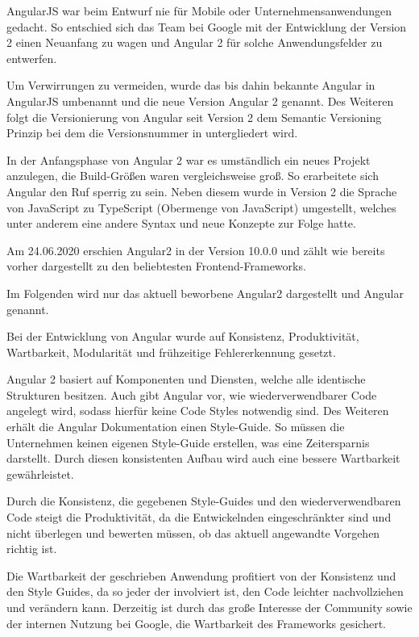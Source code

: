 AngularJS war beim Entwurf nie für Mobile oder Unternehmensanwendungen gedacht.
So entschied sich das Team bei Google mit der Entwicklung der Version 2 einen Neuanfang zu wagen und Angular 2 für solche Anwendungsfelder zu entwerfen. \cite{gaviganHistoryAngular2018}

Um Verwirrungen zu vermeiden, wurde das bis dahin bekannte Angular in AngularJS umbenannt und die neue Version Angular 2 genannt. Des Weiteren folgt die Versionierung von Angular seit Version 2 dem Semantic Versioning Prinzip bei dem die Versionsnummer in  untergliedert wird. \cite{gaviganHistoryAngular2018} 

In der Anfangsphase von Angular 2 war es umständlich ein neues Projekt anzulegen, die Build-Größen waren vergleichsweise groß. So erarbeitete sich Angular den Ruf sperrig zu sein.
Neben diesem wurde in Version 2 die Sprache von JavaScript zu TypeScript (Obermenge von JavaScript) umgestellt, welches unter anderem eine andere Syntax und neue Konzepte zur Folge hatte. \cite{gaviganHistoryAngular2018}

Am 24.06.2020 erschien Angular2 in der Version 10.0.0 \cite{googleAngularAngularVersioning2020} und zählt wie bereits vorher dargestellt zu den beliebtesten Frontend-Frameworks.

Im Folgenden wird nur das aktuell beworbene Angular2 dargestellt und Angular genannt.

Bei der Entwicklung von Angular wurde auf Konsistenz, Produktivität, Wartbarkeit, Modularität und frühzeitige Fehlererkennung gesetzt.

Angular 2 basiert auf Komponenten und Diensten, welche alle identische Strukturen besitzen. Auch gibt Angular vor, wie wiederverwendbarer Code angelegt wird, sodass hierfür keine Code Styles notwendig sind. Des Weiteren erhält die Angular Dokumentation einen Style-Guide. So müssen die Unternehmen keinen eigenen Style-Guide erstellen, was eine Zeitersparnis darstellt. Durch diesen konsistenten Aufbau wird auch eine bessere Wartbarkeit gewährleistet. \cite{wahlinWesentlichenVorteileAngular2017}

Durch die Konsistenz, die gegebenen Style-Guides und den wiederverwendbaren Code steigt die Produktivität, da die Entwickelnden eingeschränkter sind und nicht überlegen und bewerten müssen, ob das aktuell angewandte Vorgehen richtig ist.  \cite{wahlinWesentlichenVorteileAngular2017}

Die Wartbarkeit der geschrieben Anwendung profitiert von der Konsistenz und den Style Guides, da so jeder der involviert ist, den Code leichter nachvollziehen und verändern kann. Derzeitig ist durch das große Interesse der Community sowie der internen Nutzung bei Google, die Wartbarkeit des Frameworks gesichert. \cite{wahlinWesentlichenVorteileAngular2017}

